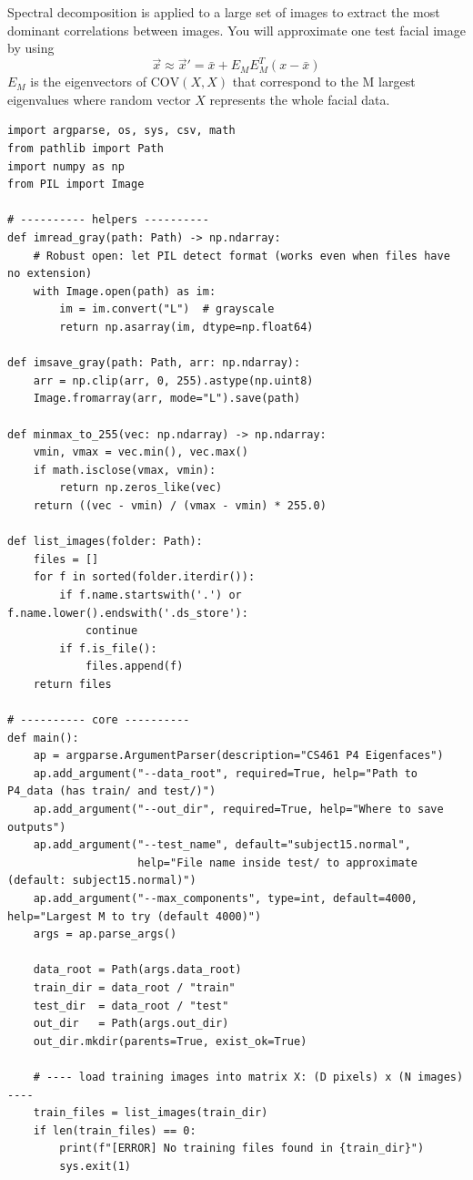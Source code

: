 \documentclass[12pt]{article}
\begin{document}
Spectral decomposition is applied to a large set of images to extract the most dominant correlations between images. You will approximate one test facial image by using
\[
\vec{x} \approx \vec{x}' = \bar{x} + E_M E_M^T (x - \bar{x})
\]
$E_M$ is the eigenvectors of $\text{COV}(X,X)$ that correspond to the M largest eigenvalues where random vector $X$ represents the whole facial data.
\begin{lstlisting}[style=pythonstyle, caption={P4 Eigenfaces Implementation (eigenface.py)}]
import argparse, os, sys, csv, math
from pathlib import Path
import numpy as np
from PIL import Image

# ---------- helpers ----------
def imread_gray(path: Path) -> np.ndarray:
    # Robust open: let PIL detect format (works even when files have no extension)
    with Image.open(path) as im:
        im = im.convert("L")  # grayscale
        return np.asarray(im, dtype=np.float64)

def imsave_gray(path: Path, arr: np.ndarray):
    arr = np.clip(arr, 0, 255).astype(np.uint8)
    Image.fromarray(arr, mode="L").save(path)

def minmax_to_255(vec: np.ndarray) -> np.ndarray:
    vmin, vmax = vec.min(), vec.max()
    if math.isclose(vmax, vmin):
        return np.zeros_like(vec)
    return ((vec - vmin) / (vmax - vmin) * 255.0)

def list_images(folder: Path):
    files = []
    for f in sorted(folder.iterdir()):
        if f.name.startswith('.') or f.name.lower().endswith('.ds_store'):
            continue
        if f.is_file():
            files.append(f)
    return files

# ---------- core ----------
def main():
    ap = argparse.ArgumentParser(description="CS461 P4 Eigenfaces")
    ap.add_argument("--data_root", required=True, help="Path to P4_data (has train/ and test/)")
    ap.add_argument("--out_dir", required=True, help="Where to save outputs")
    ap.add_argument("--test_name", default="subject15.normal",
                    help="File name inside test/ to approximate (default: subject15.normal)")
    ap.add_argument("--max_components", type=int, default=4000, help="Largest M to try (default 4000)")
    args = ap.parse_args()

    data_root = Path(args.data_root)
    train_dir = data_root / "train"
    test_dir  = data_root / "test"
    out_dir   = Path(args.out_dir)
    out_dir.mkdir(parents=True, exist_ok=True)

    # ---- load training images into matrix X: (D pixels) x (N images) ----
    train_files = list_images(train_dir)
    if len(train_files) == 0:
        print(f"[ERROR] No training files found in {train_dir}")
        sys.exit(1)


\end{lstlisting}
\end{document}
